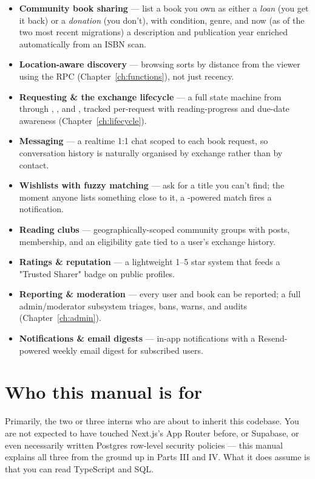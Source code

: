 \begin{itemize}
  \item \textbf{Community book sharing} — list a book you own as either a \emph{loan} (you get it back) or a \emph{donation} (you don't), with condition, genre, and now (as of the two most recent migrations) a description and publication year enriched automatically from an ISBN scan.
  \item \textbf{Location-aware discovery} — browsing sorts by distance from the viewer using the  RPC (Chapter~\ref{ch:functions}), not just recency.
  \item \textbf{Requesting \& the exchange lifecycle} — a full state machine from  through , , and , tracked per-request with reading-progress and due-date awareness (Chapter~\ref{ch:lifecycle}).
  \item \textbf{Messaging} — a realtime 1:1 chat scoped to each book request, so conversation history is naturally organised by exchange rather than by contact.
  \item \textbf{Wishlists with fuzzy matching} — ask for a title you can't find; the moment anyone lists something close to it, a -powered match fires a notification.
  \item \textbf{Reading clubs} — geographically-scoped community groups with posts, membership, and an eligibility gate tied to a user's exchange history.
  \item \textbf{Ratings \& reputation} — a lightweight 1--5 star system that feeds a "Trusted Sharer" badge on public profiles.
  \item \textbf{Reporting \& moderation} — every user and book can be reported; a full admin/moderator subsystem triages, bans, warns, and audits (Chapter~\ref{ch:admin}).
  \item \textbf{Notifications \& email digests} — in-app notifications with a Resend-powered weekly email digest for subscribed users.
\end{itemize}

\section{Who this manual is for}

Primarily, the two or three interns who are about to inherit this codebase. You are not expected to have touched Next.js's App Router before, or Supabase, or even necessarily written Postgres row-level security policies — this manual explains all three from the ground up in Parts III and IV. What it does assume is that you can read TypeScript and SQL.

